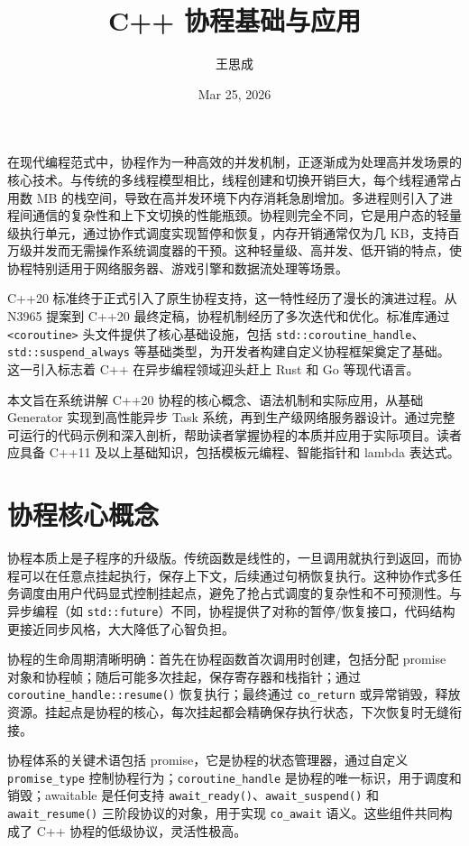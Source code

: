 \title{C++ 协程基础与应用}
\author{王思成}
\date{Mar 25, 2026}
\maketitle
在现代编程范式中，协程作为一种高效的并发机制，正逐渐成为处理高并发场景的核心技术。与传统的多线程模型相比，线程创建和切换开销巨大，每个线程通常占用数 MB 的栈空间，导致在高并发环境下内存消耗急剧增加。多进程则引入了进程间通信的复杂性和上下文切换的性能瓶颈。协程则完全不同，它是用户态的轻量级执行单元，通过协作式调度实现暂停和恢复，内存开销通常仅为几 KB，支持百万级并发而无需操作系统调度器的干预。这种轻量级、高并发、低开销的特点，使协程特别适用于网络服务器、游戏引擎和数据流处理等场景。\par
C++20 标准终于正式引入了原生协程支持，这一特性经历了漫长的演进过程。从 N3965 提案到 C++20 最终定稿，协程机制经历了多次迭代和优化。标准库通过 \texttt{<coroutine>} 头文件提供了核心基础设施，包括 \texttt{std::coroutine\_{}handle}、\texttt{std::suspend\_{}always} 等基础类型，为开发者构建自定义协程框架奠定了基础。这一引入标志着 C++ 在异步编程领域迎头赶上 Rust 和 Go 等现代语言。\par
本文旨在系统讲解 C++20 协程的核心概念、语法机制和实际应用，从基础 Generator 实现到高性能异步 Task 系统，再到生产级网络服务器设计。通过完整可运行的代码示例和深入剖析，帮助读者掌握协程的本质并应用于实际项目。读者应具备 C++11 及以上基础知识，包括模板元编程、智能指针和 lambda 表达式。\par
\chapter{协程核心概念}
协程本质上是子程序的升级版。传统函数是线性的，一旦调用就执行到返回，而协程可以在任意点挂起执行，保存上下文，后续通过句柄恢复执行。这种协作式多任务调度由用户代码显式控制挂起点，避免了抢占式调度的复杂性和不可预测性。与异步编程（如 \texttt{std::future}）不同，协程提供了对称的暂停/恢复接口，代码结构更接近同步风格，大大降低了心智负担。\par
协程的生命周期清晰明确：首先在协程函数首次调用时创建，包括分配 promise 对象和协程帧；随后可能多次挂起，保存寄存器和栈指针；通过 \texttt{coroutine\_{}handle::resume()} 恢复执行；最终通过 \texttt{co\_{}return} 或异常销毁，释放资源。挂起点是协程的核心，每次挂起都会精确保存执行状态，下次恢复时无缝衔接。\par
协程体系的关键术语包括 promise，它是协程的状态管理器，通过自定义 \texttt{promise\_{}type} 控制协程行为；\texttt{coroutine\_{}handle} 是协程的唯一标识，用于调度和销毁；awaitable 是任何支持 \texttt{await\_{}ready()}、\texttt{await\_{}suspend()} 和 \texttt{await\_{}resume()} 三阶段协议的对象，用于实现 \texttt{co\_{}await} 语义。这些组件共同构成了 C++ 协程的低级协议，灵活性极高。\par
